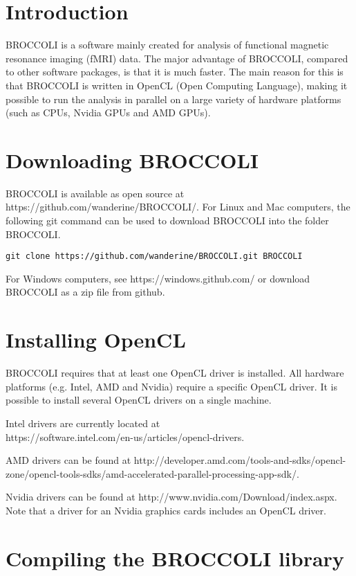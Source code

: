 \section{Introduction}

BROCCOLI is a software mainly created for analysis of functional magnetic resonance imaging (fMRI) data. The major advantage of BROCCOLI, compared to other software packages, is that it is much faster. The main reason for this is that BROCCOLI is written in OpenCL (Open Computing Language), making it possible to run the analysis in parallel on a large variety of hardware platforms (such as CPUs, Nvidia GPUs and AMD GPUs). 

\section{Downloading BROCCOLI}

BROCCOLI is available as open source at https://github.com/wanderine/BROCCOLI/. For Linux and Mac computers, the following git command can be used to download BROCCOLI into the folder BROCCOLI. 

\begin{verbatim}
git clone https://github.com/wanderine/BROCCOLI.git BROCCOLI
\end{verbatim}

For Windows computers, see https://windows.github.com/ or download BROCCOLI as a zip file from github. 

\section{Installing OpenCL}

BROCCOLI requires that at least one OpenCL driver is installed. All hardware platforms (e.g. Intel, AMD and Nvidia) require a specific OpenCL driver. It is possible to install several OpenCL drivers on a single machine.

Intel drivers are currently located at \\ https://software.intel.com/en-us/articles/opencl-drivers. 

AMD drivers can be found at http://developer.amd.com/tools-and-sdks/opencl-zone/opencl-tools-sdks/amd-accelerated-parallel-processing-app-sdk/. 

Nvidia drivers can be found at http://www.nvidia.com/Download/index.aspx. Note that a driver for an Nvidia graphics cards includes an OpenCL driver. 

\section{Compiling the BROCCOLI library}

